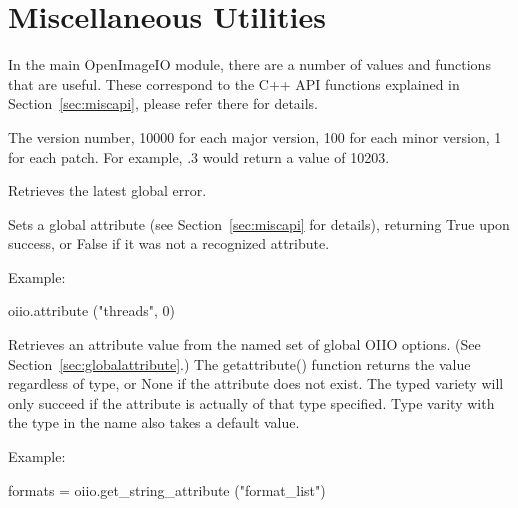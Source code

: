 \newpage
\section{Miscellaneous Utilities}
\label{sec:pythonmiscapi}

In the main {\cf OpenImageIO} module, there are a number of values and
functions that are useful.  These correspond to the C++ API functions
explained in Section~\ref{sec:miscapi}, please refer there for details.

The \product version number, 10000 for each
major version, 100 for each minor version, 1 for each patch.  For
example, .3 would return a value of 10203.
\apiend

Retrieves the latest global error.
\apiend

Sets a global attribute (see Section~\ref{sec:miscapi} for details),
returning {\cf True} upon success, or {\cf False} if it was not a
recognized attribute.  

\noindent Example:
\begin{code}
    oiio.attribute ("threads", 0)
\end{code}
\apiend

Retrieves an attribute value from the named set of global OIIO options. (See
Section~\ref{sec:globalattribute}.) The {\cf getattribute()} function
returns the value regardless of type, or {\cf None} if the attribute does
not exist.  The typed variety will only succeed if the attribute is actually
of that type specified. Type varity with the type in the name also takes a
default value.

\noindent Example:
\begin{code}
    formats = oiio.get_string_attribute ("format_list")
\end{code}
\apiend




